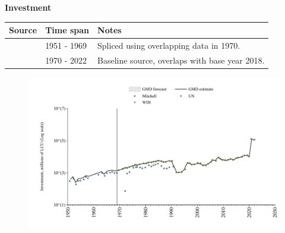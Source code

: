 \documentclass[12pt,a4paper,landscape]{article}
\begin{document}
\begin{adjustbox}{max totalsize={\paperwidth}{\paperheight},center}
\begin{minipage}[t][\textheight][t]{\textwidth}
\vspace*{0.5cm}
{}
\begin{center}
{\Large\bfseries Investment}
\end{center}
\vspace{0.5cm}
\begin{table}[H]
\centering
\small
\begin{tabular}{|l|l|l|}
\hline
\textbf{Source} & \textbf{Time span} & \textbf{Notes} \\
\hline
\rowcolor{white}\cite{Mitchell}& 1951 - 1969 &Spliced using overlapping data in 1970. \\
\rowcolor{lightgray}\cite{WDI}& 1970 - 2022 &Baseline source, overlaps with base year 2018. \\
\hline
\end{tabular}
\end{table}
\begin{figure}[H]
\centering
\includegraphics[width=\textwidth,height=0.6\textheight,keepaspectratio]{graphs/CUB_inv.pdf}
\end{figure}
\end{minipage}
\end{adjustbox}
\end{document}
